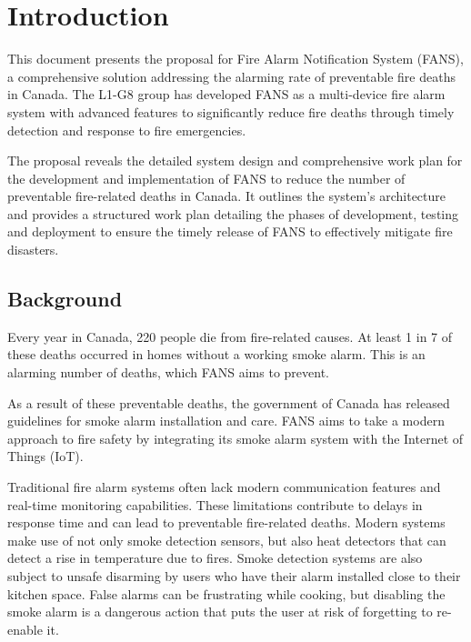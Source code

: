 \section{Introduction}

This document presents the proposal for Fire Alarm Notification System (FANS), a comprehensive solution addressing the
alarming rate of preventable fire deaths in Canada. \cite{smoke-alarm-gc} The L1-G8 group has developed FANS as a
multi-device fire alarm system with advanced features to significantly reduce fire deaths through timely detection and
response to fire emergencies.

The proposal reveals the detailed system design and comprehensive work plan for the development and implementation of
FANS to reduce the number of preventable fire-related deaths in Canada. It outlines the system's architecture and
provides a structured work plan detailing the phases of development, testing and deployment to ensure the timely
release of FANS to effectively mitigate fire disasters.

\subsection{Background}

Every year in Canada, 220 people die from fire-related causes. \cite{fire-stats} At least 1 in 7 of these deaths
occurred in homes without a working smoke alarm. \cite{fire-stats} This is an alarming number of deaths, which FANS
aims to prevent.

As a result of these preventable deaths, the government of Canada has released guidelines for smoke alarm installation
and care. \cite{smoke-alarm-gc} FANS aims to take a modern approach to fire safety by integrating its smoke alarm
system with the Internet of Things (IoT).

Traditional fire alarm systems often lack modern communication features and real-time monitoring capabilities. These
limitations contribute to delays in response time and can lead to preventable fire-related deaths. Modern systems make
use of not only smoke detection sensors, but also heat detectors that can detect a rise in temperature due to fires.
\cite{modern-fire-alarms} Smoke detection systems are also subject to unsafe disarming by users who have their alarm
installed close to their kitchen space. False alarms can be frustrating while cooking, but disabling the smoke alarm is
a dangerous action that puts the user at risk of forgetting to re-enable it. \cite{disabling-alarm}

